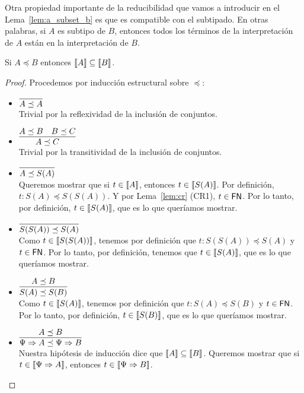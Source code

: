 Otra propiedad importante de la reducibilidad que vamos a introducir en el Lema~\ref{lem:a_subset_b} es que es compatible con el subtipado. En otras palabras, si \( A \) es subtipo de \( B \), entonces todos los términos de la interpretación de \( A \) están en la interpretación de \( B \).

\begin{lemma}\label{lem:a_subset_b}
  Si \( A \preceq B \) entonces \( \llbracket A\rrbracket \subseteq \llbracket B\rrbracket \).
\end{lemma}

\begin{proof}
  Procedemos por inducción estructural sobre \( \preceq \):
  \begin{itemize}
    \item \( \infer{A \preceq A}{} \)
      \\ Trivial por la reflexividad de la inclusión de conjuntos.
    \item \( \infer{A \preceq C}{A \preceq B & B \preceq C} \)
      \\ Trivial por la transitividad de la inclusión de conjuntos.
    \item \( \infer{A \preceq S(A)}{} \)
      \\ Queremos mostrar que si \( t \in \llbracket A\rrbracket \), entonces \( t \in \llbracket S(A)\rrbracket \). Por definición, \( t : S(A) \preceq S(S(A)) \). Y por Lema~\ref{lem:cr} (CR1), \( t \in \mathsf{FN} \). Por lo tanto, por definición, \( t \in \llbracket S(A)\rrbracket \), que es lo que queríamos mostrar.
    \item \( \infer{S(S(A)) \preceq S(A)}{} \)
      \\ Como \( t \in \llbracket S(S(A))\rrbracket \), tenemos por definición que \( t : S(S(A)) \preceq S(A) \) y \( t \in \mathsf{FN} \). Por lo tanto, por definición, tenemos que \( t \in \llbracket S(A)\rrbracket \), que es lo que queríamos mostrar.
    \item \( \infer{S(A) \preceq S(B)}{A \preceq B} \)
      \\ Como \( t \in \llbracket S(A)\rrbracket \), tenemos por definición que \( t : S(A) \preceq S(B) \) y \( t \in \mathsf{FN} \). Por lo tanto, por definición, \( t \in \llbracket S(B)\rrbracket \), que es lo que queríamos mostrar.
    \item \( \infer{\Psi \Rightarrow A \preceq \Psi \Rightarrow B}{A \preceq B} \)
      \\ Nuestra hipótesis de inducción dice que \( \llbracket A\rrbracket \subseteq \llbracket B\rrbracket \). Queremos mostrar que si \( t \in \llbracket\Psi \Rightarrow A\rrbracket \), entonces \( t \in \llbracket\Psi \Rightarrow B\rrbracket \).

\end{itemize}
\end{proof}
